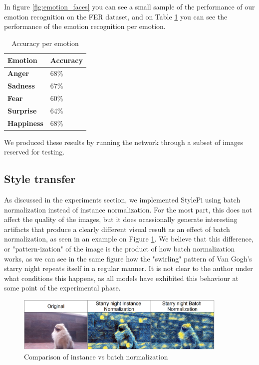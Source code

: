 In figure \ref{fig:emotion_faces} you can see a small sample of the performance of our emotion recognition on the FER dataset, and on Table \ref{tab:acc_per_emotion} you can see the performance of the emotion recognition per emotion.

\begin{table}[h]
    \centering
    \begin{tabular}{ll}
        \hline
        \textbf{Emotion}   & \textbf{Accuracy} \\ \hline
        \textbf{Anger}     & 68\%              \\
        \textbf{Sadness}   & 67\%              \\
        \textbf{Fear}      & 60\%              \\
        \textbf{Surprise}  & 64\%              \\
        \textbf{Happiness} & 68\%              \\ \hline
    \end{tabular}
    \caption{Accuracy per emotion}
    \label{tab:acc_per_emotion}
\end{table}

We produced these results by running the network through a subset of images reserved for testing.

\subsection{Style transfer}


As discussed in the experiments section, we implemented StylePi using batch normalization instead of instance normalization. For the most part, this does not affect the quality of the images, but it does ocassionally generate interesting artifacts that produce a clearly different visual result as an effect of batch normalization, as seen in an example on Figure \ref{fig:style_norm_comp}. We believe that this difference, or "pattern-ization" of the image is the product of how batch normalization works, as we can see in the same figure how the "swirling" pattern of Van Gogh's starry night repeats itself in a regular manner. It is not clear to the author under what conditions this happens, as all models have exhibited this behaviour at some point of the experimental phase.


\begin{figure}[h]
    \centering
    \includegraphics[width = 0.9\textwidth]{resources/style_norm_comp.png}
    \caption{Comparison of instance vs batch normalization}
    \label{fig:style_norm_comp}
\end{figure}

